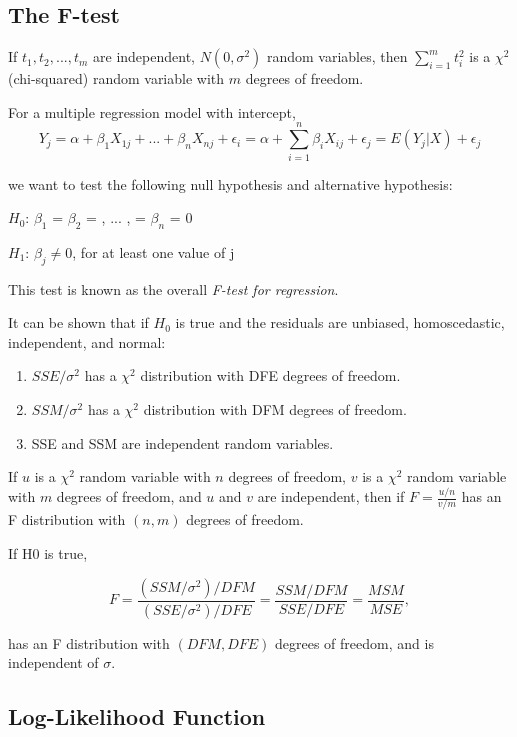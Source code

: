 \subsection{The F-test}

If $t_1, t_2, ... , t_m$ are independent, $N(0, \sigma^2)$ random variables, then $\sum_{i=1}^m t_i^2$ is a $\chi^2$ (chi-squared) random variable with $m$ degrees of freedom.

For a multiple regression model with intercept,
\begin{equation}
  Y_j = \alpha + \beta_1 X_{1j} + ... + \beta_n X_{nj} + \epsilon_i = \alpha + \sum_{i=1}^n \beta_i X_{ij} + \epsilon_j = E(Y_j | X) + \epsilon_j
\end{equation}

we want to test the following null hypothesis and alternative hypothesis:

        $H_0$:   $\beta_1$ = $\beta_2$ = , ... , = $\beta_n$ = 0

        $H_1$:   $\beta_j \neq 0$, for at least one value of j

This test is known as the overall \emph{F-test for regression}.

It can be shown that if $H_0$ is true and the residuals are unbiased, homoscedastic, independent, and normal:

\begin{enumerate}
  \item $SSE / \sigma^2$ has a $\chi^2$ distribution with DFE degrees of freedom.
  \item $SSM / \sigma^2$ has a $\chi^2$ distribution with DFM degrees of freedom.
  \item SSE and SSM are independent random variables.
\end{enumerate}

If $u$ is a $\chi^2$ random variable with $n$ degrees of freedom, $v$ is a $\chi^2$ random variable with $m$ degrees of freedom, and $u$ and $v$ are independent, then if $F = \frac{u/n}{v/m}$ has an F distribution with $(n,m)$ degrees of freedom.

If H0 is true,

\begin{equation}
  F = \frac{(SSM/\sigma^2)/DFM}{(SSE/\sigma^2)/DFE} = \frac{SSM/DFM}{SSE/DFE} = \frac{MSM}{MSE},
\end{equation}

has an F distribution with $(DFM, DFE)$ degrees of freedom, and is independent of $\sigma$.


\subsection{Log-Likelihood Function}

